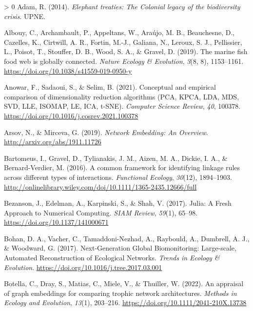 \documentclass[11pt]{article}
\newlength{\cslhangindent}
\newenvironment{CSLReferences}[3] %
 {%
  \setlength{\parindent}{0pt}
  \ifodd #1 \everypar{\setlength{\hangindent}{\cslhangindent}}\ignorespaces\fi
  \ifnum #2 > 0
  \setlength{\parskip}{#2\baselineskip}
  \fi
 }%
 {}
\begin{document}
\hypertarget{refs}{}
\begin{CSLReferences}{1}{0}
\leavevmode\hypertarget{ref-Adam2014EleTre}{}%
Adam, R. (2014). \emph{Elephant treaties: The Colonial legacy of the
biodiversity crisis}. UPNE.

\leavevmode\hypertarget{ref-Albouy2019MarFis}{}%
Albouy, C., Archambault, P., Appeltans, W., Araújo, M. B., Beauchesne,
D., Cazelles, K., Cirtwill, A. R., Fortin, M.-J., Galiana, N., Leroux,
S. J., Pellissier, L., Poisot, T., Stouffer, D. B., Wood, S. A., \&
Gravel, D. (2019). The marine fish food web is globally connected.
\emph{Nature Ecology \& Evolution}, \emph{3}(8, 8), 1153--1161.
\url{https://doi.org/10.1038/s41559-019-0950-y}

\leavevmode\hypertarget{ref-Anowar2021ConEmp}{}%
Anowar, F., Sadaoui, S., \& Selim, B. (2021). Conceptual and empirical
comparison of dimensionality reduction algorithms (PCA, KPCA, LDA, MDS,
SVD, LLE, ISOMAP, LE, ICA, t-SNE). \emph{Computer Science Review},
\emph{40}, 100378. \url{https://doi.org/10.1016/j.cosrev.2021.100378}

\leavevmode\hypertarget{ref-Arsov2019NetEmb}{}%
Arsov, N., \& Mirceva, G. (2019). \emph{Network Embedding: An Overview}.
\url{http://arxiv.org/abs/1911.11726}

\leavevmode\hypertarget{ref-Bartomeus2016ComFra}{}%
Bartomeus, I., Gravel, D., Tylianakis, J. M., Aizen, M. A., Dickie, I.
A., \& Bernard-Verdier, M. (2016). A common framework for identifying
linkage rules across different types of interactions. \emph{Functional
Ecology}, \emph{30}(12), 1894--1903.
\url{http://onlinelibrary.wiley.com/doi/10.1111/1365-2435.12666/full}

\leavevmode\hypertarget{ref-Bezanson2017JulFre}{}%
Bezanson, J., Edelman, A., Karpinski, S., \& Shah, V. (2017). Julia: A
Fresh Approach to Numerical Computing. \emph{SIAM Review}, \emph{59}(1),
65--98. \url{https://doi.org/10.1137/141000671}

\leavevmode\hypertarget{ref-Bohan2017NexGlo}{}%
Bohan, D. A., Vacher, C., Tamaddoni-Nezhad, A., Raybould, A., Dumbrell,
A. J., \& Woodward, G. (2017). Next-Generation Global Biomonitoring:
Large-scale, Automated Reconstruction of Ecological Networks.
\emph{Trends in Ecology \& Evolution}.
\url{https://doi.org/10.1016/j.tree.2017.03.001}

\leavevmode\hypertarget{ref-Botella2022AppGra}{}%
Botella, C., Dray, S., Matias, C., Miele, V., \& Thuiller, W. (2022). An
appraisal of graph embeddings for comparing trophic network
architectures. \emph{Methods in Ecology and Evolution}, \emph{13}(1),
203--216. \url{https://doi.org/10.1111/2041-210X.13738}


\end{CSLReferences}
\end{document}
